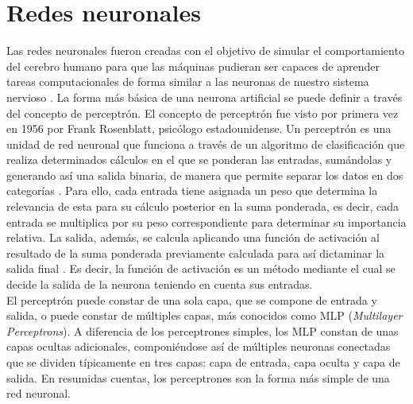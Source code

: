 \section{Redes neuronales}

Las redes neuronales fueron creadas con el objetivo de simular el comportamiento del cerebro humano para que las máquinas pudieran ser capaces de aprender tareas computacionales de forma similar a las neuronas de nuestro sistema nervioso \citep{gonzalez1995redes}. La forma más básica de una neurona artificial se puede definir a través del concepto de perceptrón. El concepto de perceptrón fue visto por primera vez en 1956 por Frank Rosenblatt, psicólogo estadounidense. Un perceptrón es una unidad de red neuronal que funciona a través de un algoritmo de clasificación que realiza determinados cálculos en el que se ponderan las entradas, sumándolas y generando así una salida binaria, de manera que permite separar los datos en dos categorías \citep{rosenblatt1958perceptron}. Para ello, cada entrada tiene asignada un peso que determina la relevancia de esta para su cálculo posterior en la suma ponderada, es decir, cada entrada se multiplica por su peso correspondiente para determinar su importancia relativa. La salida, además, se calcula aplicando una función de activación al resultado de la suma ponderada previamente calculada para así dictaminar la salida final \citep{berzal2019redes}. Es decir, la función de activación es un método mediante el cual se decide la salida de la neurona teniendo en cuenta sus entradas.\\

El perceptrón puede constar de una sola capa, que se compone de entrada y salida, o puede constar de múltiples capas, más conocidos como MLP (\textit{Multilayer Perceptrons}). A diferencia de los perceptrones simples, los MLP constan de unas capas ocultas adicionales, componiéndose así de múltiples neuronas conectadas que se dividen típicamente en tres capas: capa de entrada, capa oculta y capa de salida. En resumidas cuentas, los perceptrones son la forma más simple de una red neuronal.\\

